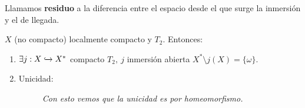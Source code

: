 \begin{defi}
Llamamos \textbf{residuo} a la diferencia entre el espacio desde el que surge la inmersión y el de llegada.
\end{defi}

\begin{prop}
$X$ (no compacto) localmente compacto y $T_2$. Entonces:
\begin{enumerate}
    \item $\exists j : X \xhookrightarrow{} X^*$ compacto $T_2,\ j$ inmersión abierta $X^* \setminus j\left( X \right) = \{\omega\}$.
    \item Unicidad: 
    \begin{figure}[H]
        \centering
        \caption{\textit{Con esto vemos que la unicidad es por homeomorfismo.}}
    \end{figure}
\end{enumerate}
\end{prop}

